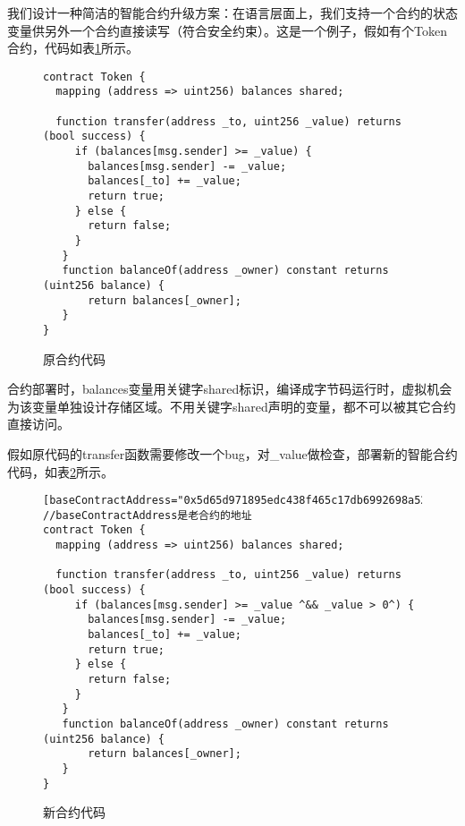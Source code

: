 我们设计一种简洁的智能合约升级方案：在语言层面上，我们支持一个合约的状态变量供另外一个合约直接读写（符合安全约束）。这是一个例子，假如有个Token合约，代码如表\ref{figure:nf:oldsc}所示。

	\begin{figure}[!h]
  	\centering
  	\begin{minipage}{0.95\linewidth}
	\begin{lstlisting}[frame=single]
contract Token {
  mapping (address => uint256) balances shared;

  function transfer(address _to, uint256 _value) returns (bool success) {
     if (balances[msg.sender] >= _value) {
       balances[msg.sender] -= _value;
       balances[_to] += _value;
       return true;
     } else {
       return false;
     }
   }
   function balanceOf(address _owner) constant returns (uint256 balance) {
       return balances[_owner];
   }
}
	\end{lstlisting}
  	\end{minipage}
  	\caption{原合约代码}
  	\label{figure:nf:oldsc}
	\end{figure}

合约部署时，balances变量用关键字shared标识，编译成字节码运行时，虚拟机会为该变量单独设计存储区域。不用关键字shared声明的变量，都不可以被其它合约直接访问。

假如原代码的transfer函数需要修改一个bug，对\_value做检查，部署新的智能合约代码，如表\ref{figure:nf:newsc}所示。

	\begin{figure}[!h]
  	\centering
  	\begin{minipage}{0.95\linewidth}
	\begin{lstlisting}[frame=single]
[baseContractAddress="0x5d65d971895edc438f465c17db6992698a52318d"]
//baseContractAddress是老合约的地址
contract Token {
  mapping (address => uint256) balances shared;

  function transfer(address _to, uint256 _value) returns (bool success) {
     if (balances[msg.sender] >= _value ^&& _value > 0^) {
       balances[msg.sender] -= _value;
       balances[_to] += _value;
       return true;
     } else {
       return false;
     }
   }
   function balanceOf(address _owner) constant returns (uint256 balance) {
       return balances[_owner];
   }
}
	\end{lstlisting}
  	\end{minipage}
  	\caption{新合约代码}
  	\label{figure:nf:newsc}
	\end{figure}

